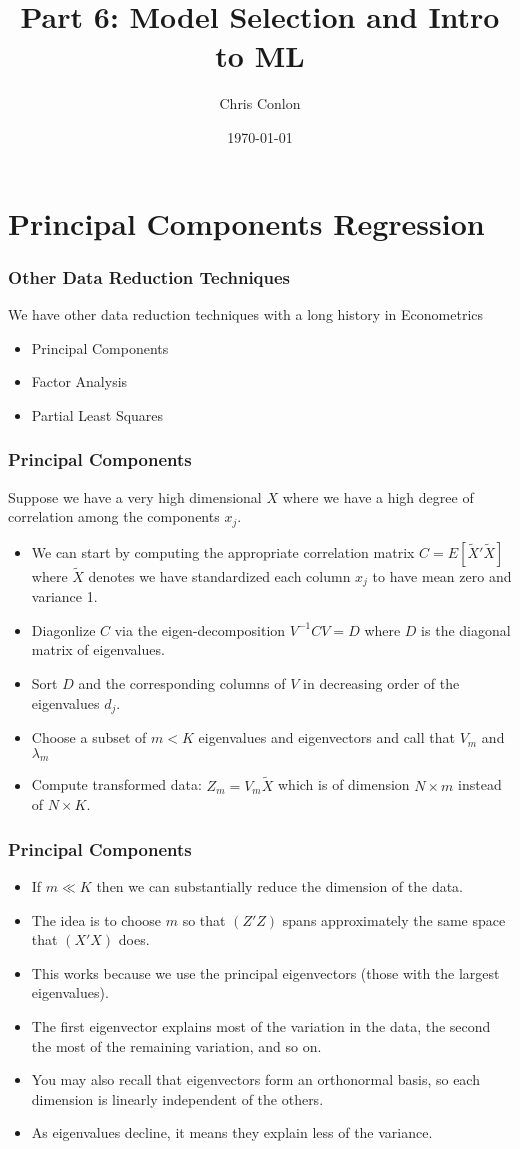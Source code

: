 \documentclass[xcolor=pdftex,dvipsnames,table,mathserif,aspectratio=169]{beamer}
\begin{document}
\title{Part 6: Model Selection and Intro to ML}
\author{Chris Conlon}
\date{\today}

\frame{\titlepage}
\section{Principal Components Regression}

\begin{frame}
\frametitle{Other Data Reduction Techniques}
We have other data reduction techniques with a long history in Econometrics
\begin{itemize}
\item Principal Components
\item Factor Analysis
\item Partial Least Squares
\end{itemize}
\end{frame}

\begin{frame}
\frametitle{Principal Components}
Suppose we have a very high dimensional $X$ where we have a high degree of correlation among the components $x_j$. 
\begin{itemize}
\item We can start by computing the appropriate correlation matrix $C=E[\tilde{X}'\tilde{X}]$ where $\tilde{X}$ denotes we have standardized each column $x_j$ to have mean zero and variance 1.
\item Diagonlize $C$ via the eigen-decomposition $V^{-1} C V = D$ where $D$ is the diagonal matrix of eigenvalues.
\item Sort $D$ and the corresponding columns of $V$ in decreasing order of the eigenvalues $d_j$.
\item Choose a subset of $m < K$ eigenvalues and eigenvectors and call that $V_m$ and $\lambda_m$
\item Compute transformed data: $Z_m = V_m \tilde{X}$ which is of dimension $N \times m$ instead of $N \times K$.
\end{itemize}
\end{frame}

\begin{frame}
\frametitle{Principal Components}
\begin{itemize}
\item If $m \ll K$ then we can substantially reduce the dimension of the data.
\item The idea is to choose $m$ so that $(Z'Z)$ spans approximately the same space that $(X'X)$ does.
\item This works because we use the \alert{principal eigenvectors} (those with the largest eigenvalues).
\item The first eigenvector explains most of the variation in the data, the second the most of the remaining variation, and so on.
\item You may also recall that eigenvectors form an \alert{orthonormal basis}, so each dimension is linearly independent of the others.
\item As eigenvalues decline, it means they explain less of the variance.
\end{itemize}
\end{frame}
\end{document}
